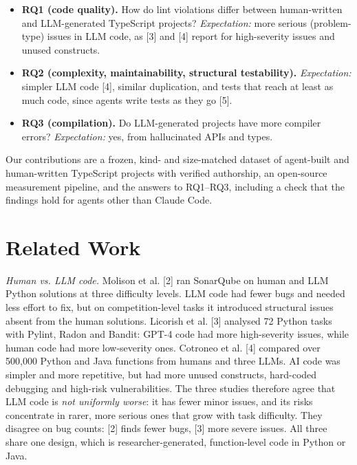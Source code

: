 \documentclass[10pt,conference]{IEEEtran}
\begin{document}
\begin{itemize}
\item \textbf{RQ1 (code quality).} How do lint violations differ between human-written and LLM-generated TypeScript projects? \emph{Expectation:} more serious (problem-type) issues in LLM code, as [3] and [4] report for high-severity issues and unused constructs.
\item \textbf{RQ2 (complexity, maintainability, structural testability).} \emph{Expectation:} simpler LLM code [4], similar duplication, and tests that reach at least as much code, since agents write tests as they go [5].
\item \textbf{RQ3 (compilation).} Do LLM-generated projects have more compiler errors? \emph{Expectation:} yes, from hallucinated APIs and types.
\end{itemize}

Our contributions are a frozen, kind- and size-matched dataset of agent-built and human-written TypeScript projects with verified authorship, an open-source measurement pipeline, and the answers to RQ1--RQ3, including a check that the findings hold for agents other than Claude Code.

\section{Related Work}
\emph{Human vs. LLM code.} Molison et al. [2] ran SonarQube on human and LLM Python solutions at three difficulty levels. LLM code had fewer bugs and needed less effort to fix, but on competition-level tasks it introduced structural issues absent from the human solutions. Licorish et al. [3] analysed 72 Python tasks with Pylint, Radon and Bandit: GPT-4 code had more high-severity issues, while human code had more low-severity ones. Cotroneo et al. [4] compared over 500,000 Python and Java functions from humans and three LLMs. AI code was simpler and more repetitive, but had more unused constructs, hard-coded debugging and high-risk vulnerabilities. The three studies therefore agree that LLM code is \emph{not uniformly worse}: it has fewer minor issues, and its risks concentrate in rarer, more serious ones that grow with task difficulty. They disagree on bug counts: [2] finds fewer bugs, [3] more severe issues. All three share one design, which is researcher-generated, function-level code in Python or Java.
\end{document}
